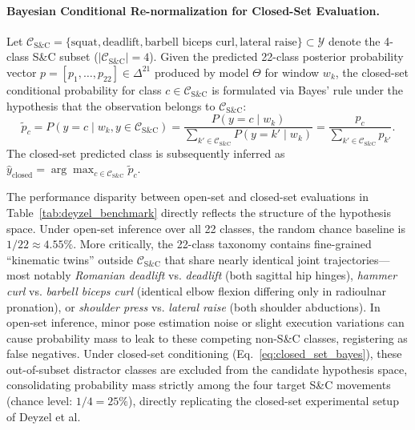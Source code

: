 \documentclass[preprint,12pt]{elsarticle}
\begin{document}
\paragraph{Bayesian Conditional Re-normalization for Closed-Set Evaluation.}
Let $\mathcal{C}_{\text{S\&C}} = \{\text{squat}, \text{deadlift}, \text{barbell biceps curl}, \text{lateral raise}\} \subset \mathcal{Y}$ denote the 4-class S\&C subset ($|\mathcal{C}_{\text{S\&C}}| = 4$). Given the predicted 22-class posterior probability vector $p = [p_1, \dots, p_{22}] \in \Delta^{21}$ produced by model $\Theta$ for window $w_k$, the closed-set conditional probability for class $c \in \mathcal{C}_{\text{S\&C}}$ is formulated via Bayes' rule under the hypothesis that the observation belongs to $\mathcal{C}_{\text{S\&C}}$:
\begin{equation}
\label{eq:closed_set_bayes}
    \tilde{p}_c = P(y = c \mid w_k, y \in \mathcal{C}_{\text{S\&C}}) = \frac{P(y = c \mid w_k)}{\sum_{k' \in \mathcal{C}_{\text{S\&C}}} P(y = k' \mid w_k)} = \frac{p_c}{\sum_{k' \in \mathcal{C}_{\text{S\&C}}} p_{k'}}.
\end{equation}
The closed-set predicted class is subsequently inferred as $\hat{y}_{\text{closed}} = \arg\max_{c \in \mathcal{C}_{\text{S\&C}}} \tilde{p}_c$. 

The performance disparity between open-set and closed-set evaluations in Table~\ref{tab:deyzel_benchmark} directly reflects the structure of the hypothesis space. Under open-set inference over all 22 classes, the random chance baseline is $1/22 \approx 4.55\%$. More critically, the 22-class taxonomy contains fine-grained ``kinematic twins'' outside $\mathcal{C}_{\text{S\&C}}$ that share nearly identical joint trajectories---most notably \textit{Romanian deadlift} vs. \textit{deadlift} (both sagittal hip hinges), \textit{hammer curl} vs. \textit{barbell biceps curl} (identical elbow flexion differing only in radioulnar pronation), or \textit{shoulder press} vs. \textit{lateral raise} (both shoulder abductions). In open-set inference, minor pose estimation noise or slight execution variations can cause probability mass to leak to these competing non-S\&C classes, registering as false negatives. Under closed-set conditioning (Eq.~\eqref{eq:closed_set_bayes}), these out-of-subset distractor classes are excluded from the candidate hypothesis space, consolidating probability mass strictly among the four target S\&C movements (chance level: $1/4 = 25\%$), directly replicating the closed-set experimental setup of Deyzel et al.
\end{document}
